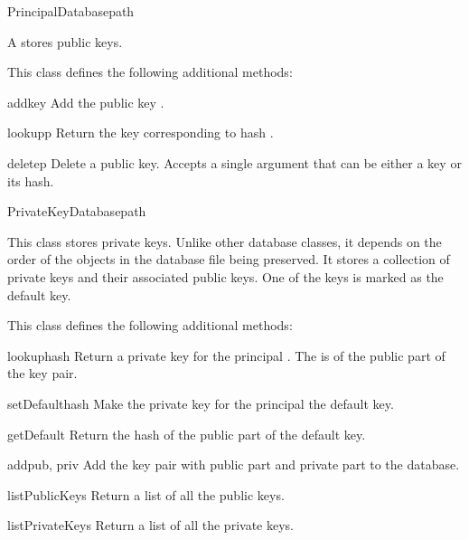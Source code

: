 \documentclass{howto}
\begin{document}
\begin{classdesc}{PrincipalDatabase}{path}

A  stores public keys.

This class defines the following additional methods:

\begin{methoddesc}{add}{key}
Add the public key .
\end{methoddesc}

\begin{methoddesc}{lookup}{p}
Return the key corresponding to hash .
\end{methoddesc}

\begin{methoddesc}{delete}{p}
Delete a public key.  Accepts a single argument  that can be
either a key or its hash.
\end{methoddesc}

\end{classdesc}

\begin{classdesc}{PrivateKeyDatabase}{path}

This class stores private keys.  Unlike other database classes, it
depends on the order of the objects in the database file being
preserved.  It stores a collection of private keys and their
associated public keys.  One of the keys is marked as the default
key. 

This class defines the following additional methods:

\begin{methoddesc}{lookup}{hash}
Return a private key for the principal .  The  is
of the public part of the key pair.
\end{methoddesc}

\begin{methoddesc}{setDefault}{hash}
Make the private key for the principal  the default key.
\end{methoddesc}

\begin{methoddesc}{getDefault}{}
Return the hash of the public part of the default key.
\end{methoddesc}

\begin{methoddesc}{add}{pub, priv}
Add the key pair with public part  and private part
 to the database.
\end{methoddesc}

\begin{methoddesc}{listPublicKeys}{}
Return a list of all the public keys.
\end{methoddesc}

\begin{methoddesc}{listPrivateKeys}{}
Return a list of all the private keys.
\end{methoddesc}

\end{classdesc}
\end{document}
